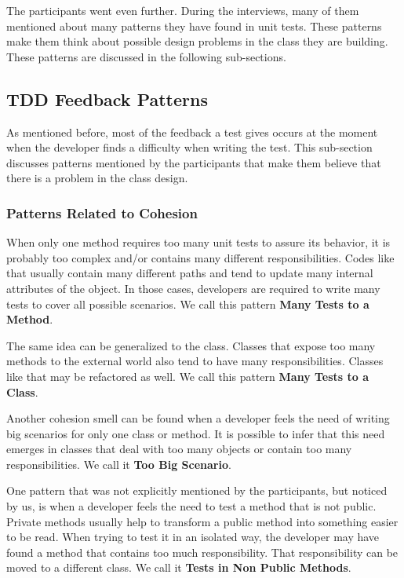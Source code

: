 \documentclass[times]{elsarticle}
\begin{document}
The participants went even further. During the interviews, many of them
mentioned about many patterns they have found in unit tests. These patterns
make them think about possible design problems in the class they are building.
These patterns are discussed in the following sub-sections.

\subsection{TDD Feedback Patterns}
\label{padroes-tdd}

As mentioned before, most of the feedback a test gives occurs at the moment
when the developer finds a difficulty when writing the test. This sub-section discusses
patterns mentioned by the participants that make them believe that there is a
problem in the class design.

\subsubsection{Patterns Related to Cohesion}

When only one method requires too many unit tests to assure its behavior,
it is probably too complex and/or contains many different responsibilities.
Codes like that usually contain many different paths and tend to update
many internal attributes of the object. In those cases, developers
are required to write many tests to cover all possible scenarios.
We call this pattern \textbf{Many Tests to a Method}.

The same idea can be generalized to the class. Classes that expose too 
many methods to the external world also tend to have many responsibilities.
Classes like that may be refactored as well.
We call this pattern \textbf{Many Tests to a Class}.

Another cohesion smell can be found when a developer feels the need
of writing big scenarios for only one class or method. It is possible to infer
that this need emerges in classes that deal with too many objects or
contain too many responsibilities. We call it \textbf{Too Big Scenario}.

One pattern that was not explicitly mentioned by the participants, but
noticed by us, is when a developer feels the need to test a method
that is not public. Private methods usually help to transform a public method
into something easier to be read. When trying to test it in an isolated
way, the developer may have found a method that contains too much responsibility.
That responsibility can be moved to a different class. 
We call it \textbf{Tests in Non Public Methods}.
\end{document}
